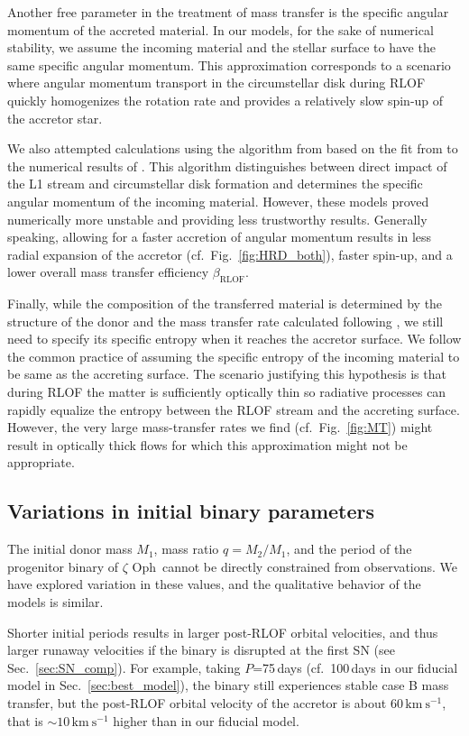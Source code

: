 \documentclass[twocolumn,twocolappendix,trackchanges]{aastex63}
\newcommand{\kms}{{\mathrm{km\ s^{-1}}}}
\DeclareRobustCommand{\Figref}[1]{Fig.~\ref{#1}}
\DeclareRobustCommand{\Secref}[1]{Sec.~\ref{#1}}
\newcommand{\zoph}{$\zeta$ Oph}
\begin{document}
Another free parameter in the treatment of mass transfer is the
specific angular momentum of the accreted material. In our models, for
the sake of numerical stability, we assume the incoming material and
the stellar surface to have the same specific angular momentum. This
approximation corresponds to a scenario where angular momentum
transport in the circumstellar disk during RLOF quickly homogenizes
the rotation rate and provides a relatively slow spin-up of the
accretor star.

We also attempted calculations using the algorithm from
\cite{demink:13} based on the fit from \cite{ulrich:76} to the
numerical results of \cite{lubow:75}. This algorithm distinguishes between
direct impact of the L1 stream and circumstellar disk
formation and determines the specific angular momentum of the incoming
material. However, these models proved numerically more unstable and
providing less trustworthy results. Generally speaking, allowing for a
faster accretion of angular momentum results in less radial expansion
of the accretor (cf.~\Figref{fig:HRD_both}), faster spin-up, and a lower overall mass
transfer efficiency $\beta_\mathrm{RLOF}$.

Finally, while the composition of the transferred material is
determined by the structure of the donor and the mass transfer rate
calculated following \cite{kolb:90}, we still need to specify its
specific entropy when it reaches the accretor surface. We follow the
common practice of assuming the specific entropy of the incoming
material to be same as the accreting surface. The scenario justifying
this hypothesis is that during RLOF the matter is
sufficiently optically thin so radiative processes can rapidly
equalize the entropy between the RLOF stream and the accreting
surface. However, the very large mass-transfer rates we find
(cf.~\Figref{fig:MT}) might result in optically thick flows for which
this approximation might not be appropriate.

\subsection{Variations in initial binary parameters}
\label{sec:bin_init}

The initial donor mass $M_1$, mass ratio $q=M_2/M_1$, and the period of the progenitor binary of \zoph\ cannot be directly
constrained from observations. We have explored variation in these values, and the
qualitative behavior of the models is similar.

Shorter initial periods results in larger post-RLOF orbital
velocities, and thus larger runaway velocities if the binary is
disrupted at the first SN (see \Secref{sec:SN_comp}). For example, taking $P$=75\,days
(cf.~100\,days in our fiducial model in \Secref{sec:best_model}), the
binary still experiences stable case B mass transfer, but the
post-RLOF orbital velocity of the accretor is about $60\,\kms$, that
is $\sim$$10\,\kms$ higher
than in our fiducial model.
\end{document}
